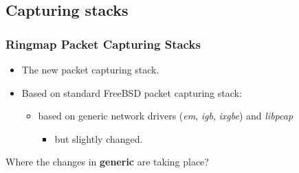 \documentclass{beamer}
\begin{document}
\subsection*{Capturing stacks}
\begin{frame}
\frametitle{Ringmap Packet Capturing Stacks}
\begin{itemize}
	\item<1-> The new packet capturing stack.
	\item<1-> Based on standard FreeBSD packet capturing stack: 		
		\begin{itemize}
			\item<1-> based on generic network drivers (\emph{em}, \emph{igb}, \emph{ixgbe}) and \emph{libpcap}
			\begin{itemize}
				\item<1-> but slightly changed.\newline
			\end{itemize}
		\end{itemize}
\end{itemize}
\begin{center}
Where the changes in \textbf{generic} are taking place?
\end{center}
\end{frame}
\end{document}
